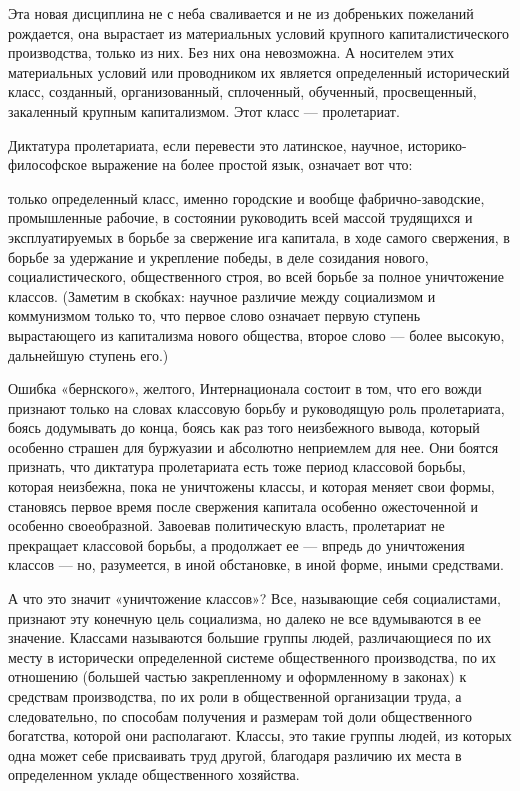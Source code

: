 \documentclass[12pt]{article}
\newcommand{\parnum}{(\arabic{parcount})}
\newcounter{parcount}
\newenvironment{parnumbers}{%
  \par%
  \everypar{\noindent \stepcounter{parcount}\marginpar[]{\parnum}}%
}{}
\begin{document}
\begin{parnumbers}
Эта новая дисциплина не с неба сваливается и не из добреньких пожеланий рождается, она вырастает из материальных условий крупного капиталистического производства, только из них. Без них она невозможна. А носителем этих материальных условий или проводником их является определенный исторический класс, созданный, организованный, сплоченный, обученный, просвещенный, закаленный крупным капитализмом. Этот класс — пролетариат.

Диктатура пролетариата, если перевести это латинское, научное, историко-философское выражение на более простой язык, означает вот что:

только определенный класс, именно городские и вообще фабрично-заводские, промышленные рабочие, в состоянии руководить всей массой трудящихся и эксплуатируемых в борьбе за свержение ига капитала, в ходе самого свержения, в борьбе за удержание и укрепление победы, в деле созидания нового, социалистического, общественного строя, во всей борьбе за полное уничтожение классов. (Заметим в скобках: научное различие между социализмом и коммунизмом только то, что первое слово означает первую ступень вырастающего из капитализма нового общества, второе слово — более высокую, дальнейшую ступень его.)

Ошибка «бернского», желтого, Интернационала состоит в том, что его вожди признают только на словах классовую борьбу и руководящую роль пролетариата, боясь додумывать до конца, боясь как раз того неизбежного вывода, который особенно страшен для буржуазии и абсолютно неприемлем для нее. Они боятся признать, что диктатура пролетариата есть тоже период классовой борьбы, которая неизбежна, пока не уничтожены классы, и которая меняет свои формы, становясь первое время после свержения капитала особенно ожесточенной и особенно своеобразной. Завоевав политическую власть, пролетариат не прекращает классовой борьбы, а продолжает ее — впредь до уничтожения классов — но, разумеется, в иной обстановке, в иной форме, иными средствами.

А что это значит «уничтожение классов»? Все, называющие себя социалистами, признают эту конечную цель социализма, но далеко не все вдумываются в ее значение. Классами называются большие группы людей, различающиеся по их месту в исторически определенной системе общественного производства, по их отношению (большей частью закрепленному и оформленному в законах) к средствам производства, по их роли в общественной организации труда, а следовательно, по способам получения и размерам той доли общественного богатства, которой они располагают. Классы, это такие группы людей, из которых одна может себе присваивать труд другой, благодаря различию их места в определенном укладе общественного хозяйства.


\end{parnumbers}
\end{document}

